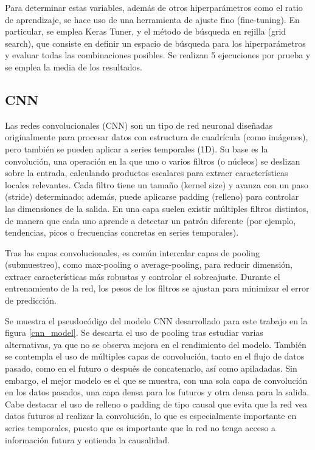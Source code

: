 Para determinar estas variables, además de otros hiperparámetros como el ratio de aprendizaje, se hace uso de una herramienta de ajuste fino (fine-tuning). En particular, se emplea Keras Tuner, y el método de búsqueda
en rejilla (grid search), que consiste en definir un espacio de búsqueda para los hiperparámetros y evaluar todas las combinaciones posibles. Se realizan 5 ejecuciones por prueba y se 
emplea la media de los resultados.

\subsection{CNN}
Las redes convolucionales (CNN) son un tipo de red neuronal diseñadas originalmente para procesar datos con estructura de cuadrícula (como imágenes), pero también se pueden aplicar a series temporales (1D).
Su base es la convolución, una operación en la que uno o varios filtros (o núcleos) se deslizan sobre la entrada, calculando productos escalares para extraer características locales relevantes.
Cada filtro tiene un tamaño (kernel size) y avanza con un paso (stride) determinado; además, puede aplicarse padding (relleno) para controlar las dimensiones de la salida.
En una capa suelen existir múltiples filtros distintos, de manera que cada uno aprende a detectar un patrón diferente (por ejemplo, tendencias, picos o frecuencias concretas en series temporales).

Tras las capas convolucionales, es común intercalar capas de pooling (submuestreo), como max-pooling o average-pooling, para reducir dimensión, extraer características más robustas y controlar el sobreajuste.
Durante el entrenamiento de la red, los pesos de los filtros se ajustan para minimizar el error de predicción.

Se muestra el pseudocódigo del modelo CNN desarrollado para este trabajo en la figura \ref{cnn_model}. Se descarta el uso de pooling tras estudiar varias alternativas, ya que no se observa mejora en 
el rendimiento del modelo. También se contempla el uso de múltiples capas de convolución, tanto en el flujo de datos pasado, como en el futuro o después de concatenarlo, así como apiladadas. 
Sin embargo, el mejor modelo es el que se muestra, con una sola capa de convolución en los datos pasados, una capa densa para los futuros y otra densa para la salida.
Cabe destacar el uso de relleno o padding de tipo causal que evita que la red vea datos futuros al realizar la convolución, lo que es especialmente importante en series temporales, puesto que es 
importante que la red no tenga acceso a información futura y entienda la causalidad.


